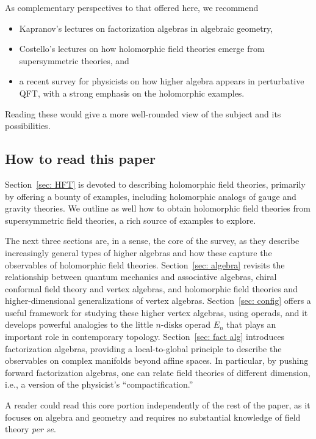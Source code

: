 \documentclass[11pt]{amsart}
\begin{document}
As complementary perspectives to that offered here, we recommend
\begin{itemize}
\item Kapranov's lectures \cite{KapLect} on factorization algebras in algebraic geometry,
\item Costello's lectures \cite{CosScheim} on how holomorphic field theories emerge from supersymmetric theories, and
\item a recent survey \cite{GKW} for physicists on how higher algebra appears in perturbative QFT, with a strong emphasis on the holomorphic examples.
\end{itemize}
Reading these would give a more well-rounded view of the subject and its possibilities.

\subsection{How to read this paper}

Section~\ref{sec: HFT} is devoted to describing holomorphic field theories, primarily by offering a bounty of examples, including holomorphic analogs of gauge and gravity theories.
We outline as well how to obtain holomorphic field theories from supersymmetric field theories,
a rich source of examples to explore.

The next three sections are, in a sense, the core of the survey,
as they describe increasingly general types of higher algebras and how these capture the observables of holomorphic field theories.
Section~\ref{sec: algebra} revisits the relationship between quantum mechanics and associative algebras,
chiral conformal field theory and vertex algebras,
and holomorphic field theories and higher-dimensional generalizations of vertex algebras.
Section~\ref{sec: config} offers a useful framework for studying these higher vertex algebras,
using operads,
and it develops powerful analogies to the little $n$-disks operad $E_n$ that plays an important role in contemporary topology.
Section~\ref{sec: fact alg} introduces factorization algebras,
providing a local-to-global principle to describe the observables on complex manifolds beyond affine spaces.
In particular, by pushing forward factorization algebras,
one can relate field theories of different dimension,
i.e., a version of the physicist's ``compactification.''

A reader could read this core portion independently of the rest of the paper,
as it focuses on algebra and geometry and requires no substantial knowledge of field theory {\it per se}.
\end{document}
